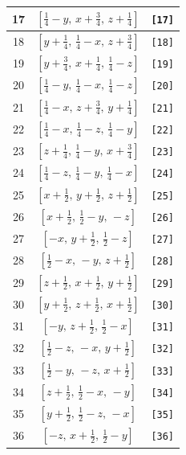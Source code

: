 \documentclass[fleqn,8pt]{jsarticle}
\begin{document}
\begin{longtable}{ccc}
17 & $\left[ \frac{1}{4} - y,\, x + \frac{3}{4},\, z + \frac{1}{4} \right]$ & {\tt [17]} \\ \hline
18 & $\left[ y + \frac{1}{4},\, \frac{1}{4} - x,\, z + \frac{3}{4} \right]$ & {\tt [18]} \\ \hline
19 & $\left[ y + \frac{3}{4},\, x + \frac{1}{4},\, \frac{1}{4} - z \right]$ & {\tt [19]} \\ \hline
20 & $\left[ \frac{1}{4} - y,\, \frac{1}{4} - x,\, \frac{1}{4} - z \right]$ & {\tt [20]} \\ \hline
21 & $\left[ \frac{1}{4} - x,\, z + \frac{3}{4},\, y + \frac{1}{4} \right]$ & {\tt [21]} \\ \hline
22 & $\left[ \frac{1}{4} - x,\, \frac{1}{4} - z,\, \frac{1}{4} - y \right]$ & {\tt [22]} \\ \hline
23 & $\left[ z + \frac{1}{4},\, \frac{1}{4} - y,\, x + \frac{3}{4} \right]$ & {\tt [23]} \\ \hline
24 & $\left[ \frac{1}{4} - z,\, \frac{1}{4} - y,\, \frac{1}{4} - x \right]$ & {\tt [24]} \\ \hline
25 & $\left[ x + \frac{1}{2},\, y + \frac{1}{2},\, z + \frac{1}{2} \right]$ & {\tt [25]} \\ \hline
26 & $\left[ x + \frac{1}{2},\, \frac{1}{2} - y,\, - z \right]$ & {\tt [26]} \\ \hline
27 & $\left[ - x,\, y + \frac{1}{2},\, \frac{1}{2} - z \right]$ & {\tt [27]} \\ \hline
28 & $\left[ \frac{1}{2} - x,\, - y,\, z + \frac{1}{2} \right]$ & {\tt [28]} \\ \hline
29 & $\left[ z + \frac{1}{2},\, x + \frac{1}{2},\, y + \frac{1}{2} \right]$ & {\tt [29]} \\ \hline
30 & $\left[ y + \frac{1}{2},\, z + \frac{1}{2},\, x + \frac{1}{2} \right]$ & {\tt [30]} \\ \hline
31 & $\left[ - y,\, z + \frac{1}{2},\, \frac{1}{2} - x \right]$ & {\tt [31]} \\ \hline
32 & $\left[ \frac{1}{2} - z,\, - x,\, y + \frac{1}{2} \right]$ & {\tt [32]} \\ \hline
33 & $\left[ \frac{1}{2} - y,\, - z,\, x + \frac{1}{2} \right]$ & {\tt [33]} \\ \hline
34 & $\left[ z + \frac{1}{2},\, \frac{1}{2} - x,\, - y \right]$ & {\tt [34]} \\ \hline
35 & $\left[ y + \frac{1}{2},\, \frac{1}{2} - z,\, - x \right]$ & {\tt [35]} \\ \hline
36 & $\left[ - z,\, x + \frac{1}{2},\, \frac{1}{2} - y \right]$ & {\tt [36]} \\ \hline

\end{longtable}
\end{document}
